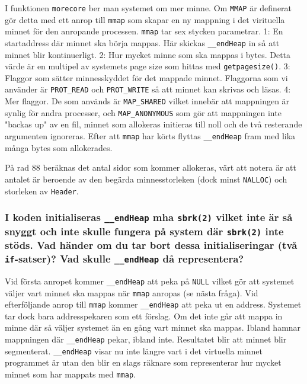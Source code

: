 \documentclass[a4paper]{article}
\begin{document}

I funktionen \texttt{morecore} ber man systemet om mer minne. Om \texttt{MMAP} är definerat gör detta med ett anrop till \texttt{mmap} som skapar en ny mappning i det virituella minnet för den anropande processen. \texttt{mmap} tar sex stycken parametrar. 1: En startaddress där minnet ska börja mappas. Här skickas \texttt{\_\_endHeap} in så att minnet blir kontinuerligt. 2: Hur mycket minne som ska mappas i bytes. Detta värde är en multipel av systemets page size som hittas med \texttt{getpagesize()}. 3: Flaggor som sätter minnesskyddet för det mappade minnet. Flaggorna som vi använder är \texttt{PROT\_READ} och \texttt{PROT\_WRITE} så att minnet kan skrivas och läsas. 4: Mer flaggor. De som används är \texttt{MAP\_SHARED} vilket innebär att mappningen är synlig för andra processer, och \texttt{MAP\_ANONYMOUS} som gör att mappningen inte "backas up" av en fil, minnet som allokeras initieras till noll och de två resterande argumenten ignoreras. Efter att \texttt{mmap} har körts flyttas \texttt{\_\_endHeap} fram med lika många bytes som allokerades.

På rad 88 beräknas det antal sidor som kommer allokeras, värt att notera är att antalet är beroende av den begärda minnesstorleken (dock minst \texttt{NALLOC}) och storleken av \texttt{Header}.
\\
\subsubsection*{I koden initialiseras \texttt{\_\_endHeap} mha \texttt{sbrk(2)} vilket inte är så snyggt och inte skulle fungera på system där \texttt{sbrk(2)} inte stöds. Vad händer om du tar bort dessa initialiseringar (två \texttt{if}-satser)? Vad skulle \texttt{\_\_endHeap} då representera?}
Vid första anropet kommer \texttt{\_\_endHeap} att peka på \texttt{NULL} vilket gör att systemet väljer vart minnet ska mappas när \texttt{mmap} anropas (se nästa fråga). Vid efterföljande anrop till \texttt{mmap} kommer \texttt{\_\_endHeap} att peka ut en address. Systemet tar dock bara addresspekaren som ett förslag. Om det inte går att mappa in minne där så väljer systemet än en gång vart minnet ska mappas. Ibland hamnar mappningen där \texttt{\_\_endHeap} pekar, ibland inte. Resultatet blir att minnet blir segmenterat. \texttt{\_\_endHeap} visar nu inte längre vart i det virtuella minnet programmet är utan den blir en slags räknare som representerar hur mycket minnet som har mappats med \texttt{mmap}.
\end{document}
